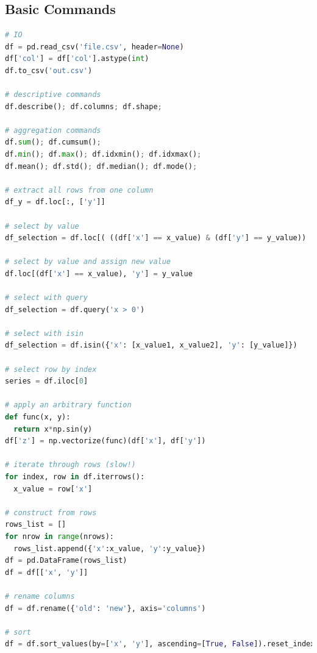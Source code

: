 \chapter{\pandas}
\label{pandas}

\section{Basic Commands}
\label{pandas:basic}

\begin{lstlisting}[language=Python]
# IO
df = pd.read_csv('file.csv', header=None)
df['col'] = df['col'].astype(int)
df.to_csv('out.csv')

# descriptive commands
df.describe(); df.columns; df.shape;

# aggregation commands
df.sum(); df.cumsum();
df.min(); df.max(); df.idxmin(); df.idxmax();
df.mean(); df.std(); df.median(); df.mode();

# extract all rows from one column
df_y = df.loc[:, ['y']]

# select by value
df_selection = df.loc[( ((df['x'] == x_value) & (df['y'] == y_value)) | (df['z'] > z_value))]

# select by value and assign new value
df.loc[(df['x'] == x_value), 'y'] = y_value

# select with query
df_selection = df.query('x > 0')

# select with isin
df_selection = df.isin({'x': [x_value1, x_value2], 'y': [y_value]})

# select row by index
series = df.iloc[0]

# apply an arbitrary function
def func(x, y):
  return x*np.sin(y)
df['z'] = np.vectorize(func)(df['x'], df['y'])

# iterate through rows (slow!)
for index, row in df.iterrows():
  x_value = row['x']

# construct from rows
rows_list = []
for nrow in range(nrows):
  rows_list.append({'x':x_value, 'y':y_value})
df = pd.DataFrame(rows_list)
df = df[['x', 'y']]

# rename columns
df = df.rename({'old': 'new'}, axis='columns')

# sort
df = df.sort_values(by=['x', 'y'], ascending=[True, False]).reset_index(drop=True)


\end{lstlisting}
